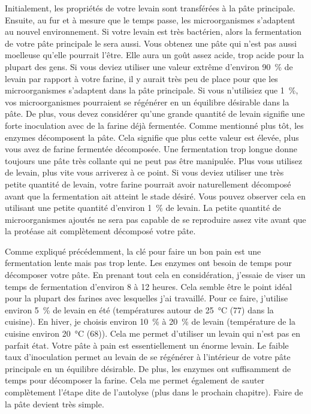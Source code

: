 Initialement, les propriétés de votre levain sont transférées à la pâte principale. Ensuite,
au fur et à mesure que le temps passe, les microorganismes s'adaptent au nouvel environnement. Si votre
levain est très bactérien, alors la fermentation de votre pâte principale le sera aussi. Vous
obtenez une pâte qui n'est pas aussi moelleuse qu'elle pourrait l'être. Elle aura un goût assez
acide, trop acide pour la plupart des gens.
Si vous deviez utiliser une valeur extrême d'environ \qty{90}{\percent} de levain par rapport à votre farine, il y aurait très peu de place pour que les microorganismes s'adaptent dans la pâte principale.
Si vous n'utilisiez que \qty{1}{\percent}, vos microorganismes pourraient se régénérer en un équilibre désirable dans la pâte. De plus, vous devez considérer qu'une grande quantité de levain signifie une forte inoculation avec de la farine déjà fermentée. Comme mentionné plus tôt, les enzymes décomposent la pâte. Cela signifie que plus cette valeur est élevée, plus vous avez de farine fermentée décomposée. Une fermentation trop longue donne toujours une pâte très collante qui ne peut pas être manipulée. Plus vous utilisez de levain, plus vite vous arriverez à ce point. Si vous deviez utiliser une très petite quantité de levain, votre farine pourrait avoir naturellement décomposé avant que la fermentation ait atteint le stade désiré. Vous pouvez observer cela en utilisant une petite quantité d'environ \qty{1}{\percent} de levain. La petite quantité de microorganismes ajoutés ne sera pas capable de se reproduire assez vite avant que la protéase ait complètement décomposé votre pâte.

Comme expliqué précédemment, la clé pour faire un bon pain est une fermentation lente mais pas trop lente. Les enzymes ont besoin de temps pour décomposer votre pâte. En prenant tout cela en considération, j'essaie de viser un temps de fermentation d'environ 8 à 12 heures. Cela semble être le point idéal pour la plupart des farines avec lesquelles j'ai travaillé. Pour ce faire, j'utilise environ \qty{5}{\percent} de levain en été (températures autour de \qty{25}{\degreeCelsius} (\qty{77}{\degF}) dans la cuisine). En hiver, je choisis environ \qty{10}{\percent} à \qty{20}{\percent} de levain (température de la cuisine environ \qty{20}{\degreeCelsius} (\qty{68}{\degF})). Cela me permet d'utiliser un levain qui n'est pas en parfait état. Votre pâte à pain est essentiellement un énorme levain. Le faible taux d'inoculation permet au levain de se régénérer à l'intérieur de votre pâte principale en un équilibre désirable. De plus, les enzymes ont suffisamment de temps pour décomposer la farine. Cela me permet également de sauter complètement l'étape dite de l'autolyse (plus dans le prochain chapitre). Faire de la pâte devient très simple.

